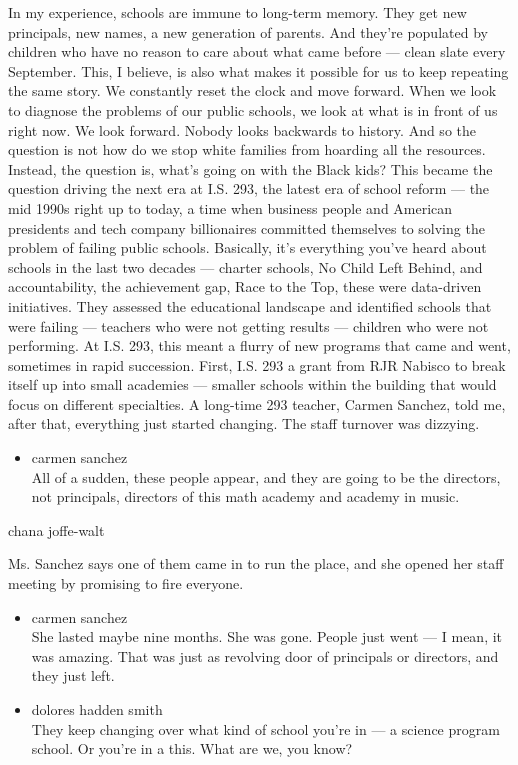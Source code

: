 In my experience, schools are immune to long-term memory. They get new
principals, new names, a new generation of parents. And they're
populated by children who have no reason to care about what came before
--- clean slate every September. This, I believe, is also what makes it
possible for us to keep repeating the same story. We constantly reset
the clock and move forward. When we look to diagnose the problems of our
public schools, we look at what is in front of us right now. We look
forward. Nobody looks backwards to history. And so the question is not
how do we stop white families from hoarding all the resources. Instead,
the question is, what's going on with the Black kids? This became the
question driving the next era at I.S. 293, the latest era of school
reform --- the mid 1990s right up to today, a time when business people
and American presidents and tech company billionaires committed
themselves to solving the problem of failing public schools. Basically,
it's everything you've heard about schools in the last two decades ---
charter schools, No Child Left Behind, and accountability, the
achievement gap, Race to the Top, these were data-driven initiatives.
They assessed the educational landscape and identified schools that were
failing --- teachers who were not getting results --- children who were
not performing. At I.S. 293, this meant a flurry of new programs that
came and went, sometimes in rapid succession. First, I.S. 293 a grant
from RJR Nabisco to break itself up into small academies --- smaller
schools within the building that would focus on different specialties. A
long-time 293 teacher, Carmen Sanchez, told me, after that, everything
just started changing. The staff turnover was dizzying.

\begin{itemize}
\tightlist
\item
  carmen sanchez\\
  All of a sudden, these people appear, and they are going to be the
  directors, not principals, directors of this math academy and academy
  in music.
\end{itemize}

chana joffe-walt

Ms. Sanchez says one of them came in to run the place, and she opened
her staff meeting by promising to fire everyone.

\begin{itemize}
\item
  carmen sanchez\\
  She lasted maybe nine months. She was gone. People just went --- I
  mean, it was amazing. That was just as revolving door of principals or
  directors, and they just left.
\item
  dolores hadden smith\\
  They keep changing over what kind of school you're in --- a science
  program school. Or you're in a this. What are we, you know?
\end{itemize}


